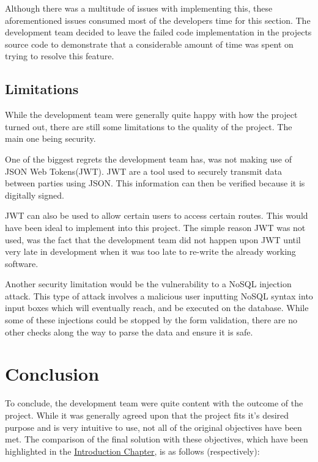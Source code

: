 \bigskip

Although there was a multitude of issues with implementing this, these aforementioned issues consumed most of the developers time for this section. The development team decided to leave the failed code implementation in the projects source code to demonstrate that a considerable amount of time was spent on trying to resolve this feature.

\section{Limitations}
\label{sec:SystemEvaluationLimitations}

While the development team were generally quite happy with how the project turned out, there are still some limitations to the quality of the project. The main one being security.

One of the biggest regrets the development team has, was not making use of JSON Web Tokens(JWT)\cite{jones2015json}.
JWT are a tool used to securely transmit data between parties using JSON. This information can then be verified because it is digitally signed. 

JWT can also be used to allow certain users to access certain routes. This would have been ideal to implement into this project. The simple reason JWT was not used, was the fact that the development team did not happen upon JWT until very late in development when it was too late to re-write the already working software. 

\bigskip

Another security limitation would be the vulnerability to a NoSQL injection attack\cite{ron2015no}. This type of attack involves a malicious user inputting NoSQL syntax into input boxes which will eventually reach, and be executed on the database. While some of these injections could be stopped by the form validation, there are no other checks along the way to parse the data and ensure it is safe.  



\chapter{Conclusion}
\label{sec:Conclusion}
To conclude, the development team were quite content with the outcome of the project. While it was generally agreed upon that the project fits it's desired purpose and is very intuitive to use, not all of the original objectives have been met. The comparison of the final solution with these objectives, which have been highlighted in the  \hyperref[sec:IntroductionObjectives]{\underline{Introduction Chapter}}, is as follows (respectively):

